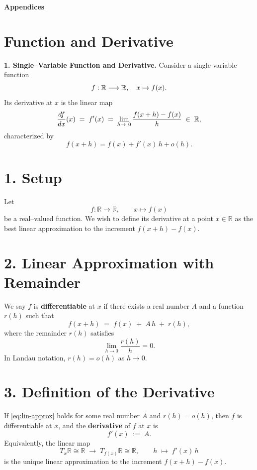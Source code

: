 \documentclass[11pt,openany]{article}
\renewcommand{\emph}[1]{\textbf{#1}}
\begin{document}
\newpage
\appendix
\textbf{\LARGE\color{titleTealBlue!100!gray}\normalfont\sffamily\bfseries Appendices}
\section{Function and Derivative}

\noindent\textbf{1. Single–Variable Function and Derivative.}\;  
Consider a single-variable function \[
f:\mathbb{R}\longrightarrow\mathbb{R},
\quad
x\mapsto f(x).
\]
Its derivative at \(x\) is the linear map
\[
\frac{df}{dx}(x)\;=\;f'(x)\;=\;\lim\limits_{h\to\ 0}\frac{f(x+h)-f(x)}{h}
\;\in\;\R,
\]
characterized by
\[
f(x+h)=f(x)+f'(x)\,h+o(h).
\]

\section*{1. Setup}

Let
\[
f:\mathbb{R}\longrightarrow\mathbb{R},
\qquad
x\mapsto f(x)
\]
be a real–valued function.  We wish to define its derivative at a point $x\in\mathbb{R}$ as the best linear approximation to the increment $f(x+h)-f(x)$.

\section*{2. Linear Approximation with Remainder}

We say $f$ is \emph{differentiable} at $x$ if there exists a real number $A$ and a function $r(h)$ such that
\begin{equation}\label{eq:lin-approx}
	f(x+h) \;=\; f(x) \;+\; A\,h \;+\; r(h),
\end{equation}
where the remainder $r(h)$ satisfies
\[
\lim_{h\to0} \frac{r(h)}{h} = 0.
\]
In Landau notation, $r(h)=o(h)$ as $h\to0$.

\section*{3. Definition of the Derivative}

\begin{definition}
	If \eqref{eq:lin-approx} holds for some real number $A$ and $r(h)=o(h)$, then $f$ is differentiable at $x$, and the \emph{derivative} of $f$ at $x$ is
	\[
	f'(x) \;:=\; A.
	\]
	Equivalently, the linear map
	\[
	T_x\mathbb{R}\cong\mathbb{R}\;\longrightarrow\;T_{f(x)}\mathbb{R}\cong\mathbb{R},
	\qquad
	h \;\mapsto\; f'(x)\,h
	\]
	is the unique linear approximation to the increment $f(x+h)-f(x)$.
\end{definition}
\end{document}
